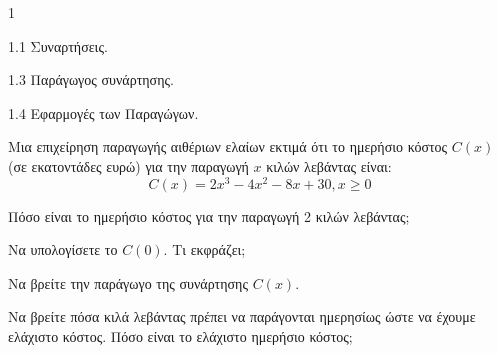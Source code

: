 \begin{ylh}{1}
    \item 1.1 Συναρτήσεις.
    \item 1.3 Παράγωγος συνάρτησης.
    \item 1.4 Εφαρμογές των Παραγώγων.
\end{ylh}
Μια επιχείρηση παραγωγής αιθέριων ελαίων εκτιμά ότι το ημερήσιο κόστος $C(x)$ (σε εκατοντάδες ευρώ) για την παραγωγή $x$ κιλών λεβάντας είναι:
\[ C(x) = 2x^3 - 4x^2 - 8x + 30, x \ge 0 \]
\begin{alist}
\item Πόσο είναι το ημερήσιο κόστος για την παραγωγή 2 κιλών λεβάντας; 
\item Να υπολογίσετε το $C(0)$. Τι εκφράζει; 
\item Να βρείτε την παράγωγο της συνάρτησης $C(x)$. 
\item Να βρείτε πόσα κιλά λεβάντας πρέπει να παράγονται ημερησίως ώστε να έχουμε ελάχιστο κόστος. Πόσο είναι το ελάχιστο ημερήσιο κόστος; 
\end{alist}

